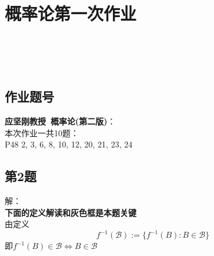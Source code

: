 \documentclass[10pt,a4paper]{article}
\begin{document}

{\centering\section*{概率论第一次作业}}
%
{} \\
 \\
 \\

\subsection{作业题号}
\textbf{应坚刚教授\ 概率论(第二版)}：\\
本次作业一共10题：\\
P48 2, 3, 6, 8, 10, 12, 20, 21, 23, 24

\subsection{第2题}
解：\\
\textbf{下面的定义解读和灰色框是本题关键} \\
由定义 $$ f^{-1}(\mathscr{B}):=\{f^{-1}(B)\colon B\in\mathscr{B}	\} $$ 
	即$ f^{-1}(B)\in\mathscr{B}\iff B\in\mathscr{B} $
\end{document}
